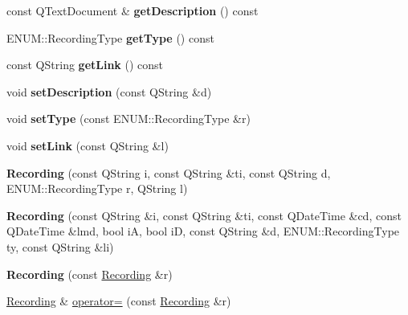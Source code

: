 \begin{DoxyCompactItemize}
\item 
\mbox{\label{class_recording_a4e0e357b15bf6409148f44ddb8ecd19b}} 
const Q\+Text\+Document \& {\bfseries get\+Description} () const
\item 
\mbox{\label{class_recording_a60a269e2cb74dd0b1e3781580d22bdcc}} 
E\+N\+U\+M\+::\+Recording\+Type {\bfseries get\+Type} () const
\item 
\mbox{\label{class_recording_afccf7d9ec99810c4b4a7f348069e5760}} 
const Q\+String {\bfseries get\+Link} () const
\item 
\mbox{\label{class_recording_ac00ad5d97ab59f489bcb20ea68316fa4}} 
void {\bfseries set\+Description} (const Q\+String \&d)
\item 
\mbox{\label{class_recording_a4c2d04de136f59e122bc05c8c581a550}} 
void {\bfseries set\+Type} (const E\+N\+U\+M\+::\+Recording\+Type \&r)
\item 
\mbox{\label{class_recording_aa8c715e910a52614d836a4ea8572bd20}} 
void {\bfseries set\+Link} (const Q\+String \&l)
\item 
\mbox{\label{class_recording_a2e3359660cd7573807fb46c15daf4e78}} 
{\bfseries Recording} (const Q\+String i, const Q\+String \&ti, const Q\+String d, E\+N\+U\+M\+::\+Recording\+Type r, Q\+String l)
\item 
\mbox{\label{class_recording_a93af6ebb8ec5ae00ac85679756c82049}} 
{\bfseries Recording} (const Q\+String \&i, const Q\+String \&ti, const Q\+Date\+Time \&cd, const Q\+Date\+Time \&lmd, bool iA, bool iD, const Q\+String \&d, E\+N\+U\+M\+::\+Recording\+Type ty, const Q\+String \&li)
\item 
\mbox{\label{class_recording_ab354d60b8ecb06699378a849f6143ac6}} 
{\bfseries Recording} (const \hyperlink{class_recording}{Recording} \&r)
\item 
\mbox{\label{class_recording_ac5c7522d695c8a657f5e801df97a9e06}} 
\hyperlink{class_recording}{Recording} \& \hyperlink{class_recording_ac5c7522d695c8a657f5e801df97a9e06}{operator=} (const \hyperlink{class_recording}{Recording} \&r)

\end{DoxyCompactItemize}
